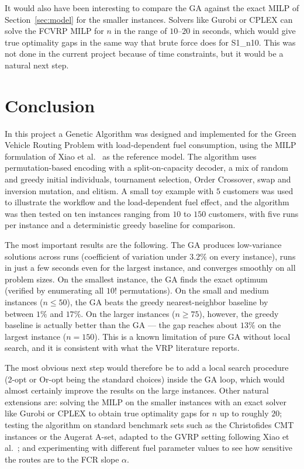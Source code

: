 \documentclass [a4paper, 11pt, titlepage] {article}
\begin{document}
It would also have been interesting to compare the GA against the exact MILP of Section~\ref{sec:model} for the smaller instances. Solvers like Gurobi or CPLEX can solve the FCVRP MILP for $n$ in the range of $10$--$20$ in seconds, which would give true optimality gaps in the same way that brute force does for S1\_n10. This was not done in the current project because of time constraints, but it would be a natural next step.

\section{Conclusion}
\label{sec:conclusion}

In this project a Genetic Algorithm was designed and implemented for the Green Vehicle Routing Problem with load-dependent fuel consumption, using the MILP formulation of Xiao et al.\ \cite{xiao2012} as the reference model. The algorithm uses permutation-based encoding with a split-on-capacity decoder, a mix of random and greedy initial individuals, tournament selection, Order Crossover, swap and inversion mutation, and elitism. A small toy example with $5$ customers was used to illustrate the workflow and the load-dependent fuel effect, and the algorithm was then tested on ten instances ranging from $10$ to $150$ customers, with five runs per instance and a deterministic greedy baseline for comparison.

The most important results are the following. The GA produces low-variance solutions across runs (coefficient of variation under $3.2\%$ on every instance), runs in just a few seconds even for the largest instance, and converges smoothly on all problem sizes. On the smallest instance, the GA finds the exact optimum (verified by enumerating all $10!$ permutations). On the small and medium instances ($n \leq 50$), the GA beats the greedy nearest-neighbor baseline by between $1\%$ and $17\%$. On the larger instances ($n \geq 75$), however, the greedy baseline is actually better than the GA --- the gap reaches about $13\%$ on the largest instance ($n = 150$). This is a known limitation of pure GA without local search, and it is consistent with what the VRP literature reports.

The most obvious next step would therefore be to add a local search procedure (2-opt or Or-opt being the standard choices) inside the GA loop, which would almost certainly improve the results on the large instances. Other natural extensions are: solving the MILP on the smaller instances with an exact solver like Gurobi or CPLEX to obtain true optimality gaps for $n$ up to roughly $20$; testing the algorithm on standard benchmark sets such as the Christofides CMT instances or the Augerat A-set, adapted to the GVRP setting following Xiao et al.\ \cite{xiao2012}; and experimenting with different fuel parameter values to see how sensitive the routes are to the FCR slope $\alpha$.
\end{document}
